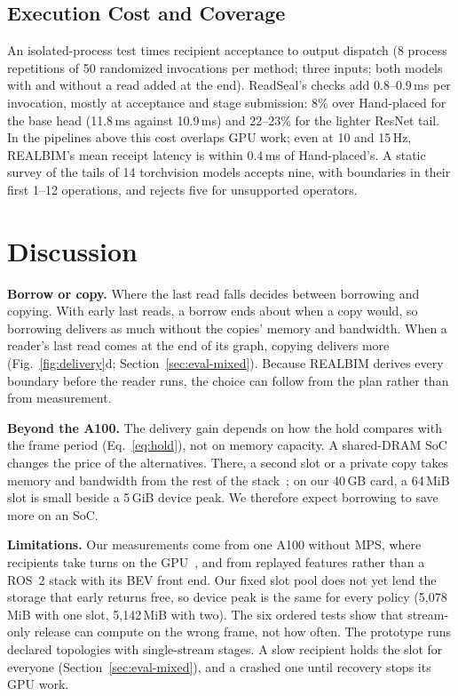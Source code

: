\documentclass[conference]{IEEEtran}
\newcommand{\sys}{REALBIM}
\newcommand{\hps}{Hand-placed}
\newcommand{\MiB}{\,MiB}
\newcommand{\ms}{\,ms}
\newcommand{\Hz}{\,Hz}
\begin{document}
\subsection{Execution Cost and Coverage}
\label{sec:eval-cost}

An isolated-process test times recipient acceptance to output dispatch (8 process repetitions of 50 randomized invocations per method; three inputs; both models with and without a read added at the end). ReadSeal's checks add 0.8--0.9\ms{} per invocation, mostly at acceptance and stage submission: 8\% over \hps{} for the base head (11.8\ms{} against 10.9\ms) and 22--23\% for the lighter ResNet tail. In the pipelines above this cost overlaps GPU work; even at 10 and 15\Hz, \sys's mean receipt latency is within 0.4\ms{} of \hps's. A static survey of the tails of 14 torchvision models accepts nine, with boundaries in their first 1--12 operations, and rejects five for unsupported operators.

\section{Discussion}
\label{sec:discussion}

\textbf{Borrow or copy.} Where the last read falls decides between borrowing and copying. With early last reads, a borrow ends about when a copy would, so borrowing delivers as much without the copies' memory and bandwidth. When a reader's last read comes at the end of its graph, copying delivers more (Fig.~\ref{fig:delivery}d; Section~\ref{sec:eval-mixed}). Because \sys{} derives every boundary before the reader runs, the choice can follow from the plan rather than from measurement.

\textbf{Beyond the A100.} The delivery gain depends on how the hold compares with the frame period (Eq.~\eqref{eq:hold}), not on memory capacity. A shared-DRAM SoC changes the price of the alternatives. There, a second slot or a private copy takes memory and bandwidth from the rest of the stack~\cite{haxconn}; on our 40\,GB card, a 64\MiB{} slot is small beside a 5\,GiB device peak. We therefore expect borrowing to save more on an SoC.

\textbf{Limitations.} Our measurements come from one A100 without MPS, where recipients take turns on the GPU~\cite{reef,orion}, and from replayed features rather than a ROS~2 stack with its BEV front end. Our fixed slot pool does not yet lend the storage that early returns free, so device peak is the same for every policy (5,078\MiB{} with one slot, 5,142\MiB{} with two). The six ordered tests show that stream-only release can compute on the wrong frame, not how often. The prototype runs declared topologies with single-stream stages. A slow recipient holds the slot for everyone (Section~\ref{sec:eval-mixed}), and a crashed one until recovery stops its GPU work.
\end{document}

